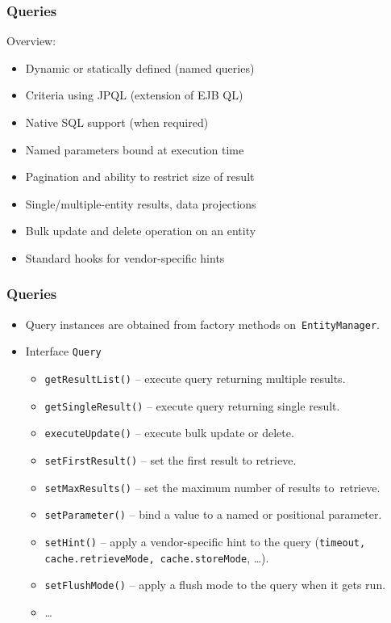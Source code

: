 \documentclass[10pt,xcolor=pdflatex]{beamer}
\begin{document}
\begin{frame}[fragile]\frametitle{Queries}
Overview:
	\renewcommand{\baselinestretch}{1.2}
	\begin{itemize}
		\item Dynamic or statically defined (named queries)
		\item Criteria using JPQL (extension of EJB QL)
		\item Native SQL support (when required)
		\item Named parameters bound at execution time
		\item Pagination and ability to restrict size of result
		\item Single/multiple-entity results, data projections
		\item Bulk update and delete operation on an entity
		\item Standard hooks for vendor-specific hints
	\end{itemize}
    \renewcommand{\baselinestretch}{1.0}
\end{frame}

\begin{frame}[fragile]\frametitle{Queries}
	\begin{itemize}
		\item Query instances are obtained from factory methods on~\texttt{EntityManager}.
		\item Interface \texttt{Query}
        \begin{itemize}
			\item \verb'getResultList()' -- execute query returning multiple results.
            \item \verb'getSingleResult()' -- execute query returning single result.
            \item \verb'executeUpdate()' -- execute bulk update or delete.
            \item \verb'setFirstResult()' -- set the first result to retrieve.
            \item \verb'setMaxResults()' -- set the maximum number of results to~retrieve.
            \item \verb'setParameter()' -- bind a value to a named or positional parameter.
            \item \verb'setHint()' -- apply a vendor-specific hint to the query (\texttt{timeout, cache.retrieveMode, cache.storeMode}, \ldots).
            \item \verb'setFlushMode()' -- apply a flush mode to the query when it gets run.
            \item \ldots
        \end{itemize}
	\end{itemize}
\end{frame}
\end{document}
